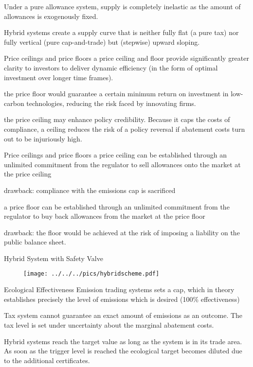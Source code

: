 	Under a pure allowance system, supply is completely inelastic as the amount of allowances is exogenously fixed.
	
	Hybrid systems create a supply curve that is neither fully flat (a pure tax) nor fully vertical
	(pure cap-and-trade) but (stepwise) upward sloping.


Price ceilings and price floors
	a price ceiling and floor provide significantly
	greater clarity to investors to deliver dynamic efficiency (in the form of optimal investment
	over longer time frames).
	
	the price floor would guarantee a certain minimum return on
	investment in low-carbon technologies, reducing the risk faced by innovating firms.
	
	the price ceiling may enhance policy credibility. Because it caps the costs of
	compliance, a ceiling reduces the risk of a policy reversal if abatement costs turn out to be
	injuriously high.


Price ceilings and price floors
	a price ceiling can be established through an unlimited commitment from the regulator to sell allowances onto the market at the price ceiling
	
	drawback: compliance with the emissions cap is sacrificed
	
	a price floor can be established through an unlimited commitment from the regulator to buy back
	allowances from the market at the price floor
	
	drawback: the floor would be achieved at the risk of imposing a liability on the public balance sheet.


Hybrid System with Safety Valve
	\begin{center}
	\begin{figure}[h!]
	\centering
	\texttt{[image: ../../../pics/hybridscheme.pdf]}
	\end{figure}
	\end{center}


Ecological Effectiveness
	Emission trading systems sets a cap, which in theory establishes precisely the level of emissions which is desired (100\% effectiveness)
	
	Tax system cannot guarantee an exact amount of emissions as an  outcome. The tax level is set under uncertainty 
	about the marginal abatement costs.
	
	Hybrid systems reach the target value as long as the system is in its trade area. As soon as the trigger level 
	is reached the ecological target becomes diluted due to the additional certificates.



